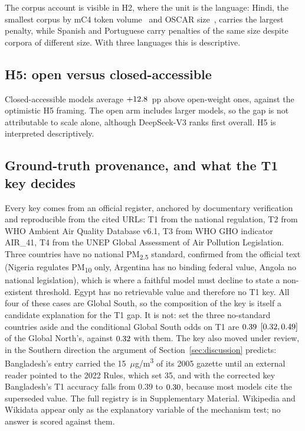 The corpus account is visible in H2, where the unit is the language: Hindi,
the smallest corpus by mC4 token volume~\citep{xue2021mt5} and OSCAR
size~\citep{abadji2022oscar}, carries the largest penalty, while Spanish and
Portuguese carry penalties of the same size despite corpora of different size.
With three languages this is descriptive.

\subsection{H5: open versus closed-accessible}
\label{sec:results:h5}

Closed-accessible models average $+12.8$~pp above open-weight ones, against
the optimistic H5 framing. The open arm includes larger models, so the gap is
not attributable to scale alone, although DeepSeek-V3 ranks first overall. H5
is interpreted descriptively.

\subsection{Ground-truth provenance, and what the T1 key decides}
\label{sec:results:gt}
\label{sec:results:t1}

Every key comes from an official register, anchored by documentary
verification and reproducible from the cited URLs: T1 from the national
regulation, T2 from WHO Ambient Air Quality Database v6.1, T3 from WHO GHO
indicator AIR\_41, T4 from the UNEP Global Assessment of Air Pollution
Legislation. Three countries have no national PM\textsubscript{2.5} standard,
confirmed from the official text (Nigeria regulates PM\textsubscript{10} only,
Argentina has no binding federal value, Angola no national legislation), which
is where a faithful model must decline to state a non-existent threshold. Egypt
has no retrievable value and therefore no T1 key. All four of these cases are
Global South, so the composition of the key is itself a candidate explanation
for the T1 gap. It is not: set the three no-standard countries aside and the
conditional Global South odds on T1 are $0.39$ $[0.32,0.49]$ of the Global
North's, against $0.32$ with them. The key also moved under review, in the
Southern direction the argument of Section~\ref{sec:discussion} predicts:
Bangladesh's entry carried the 15~$\mu$g/m\textsuperscript{3} of its 2005
gazette until an external reader pointed to the 2022 Rules, which set 35, and
with the corrected key Bangladesh's T1 accuracy falls from $0.39$ to $0.30$,
because most models cite the superseded value. The full registry is in
Supplementary Material. Wikipedia and Wikidata appear only as the explanatory
variable of the mechanism test; no answer is scored against them.

